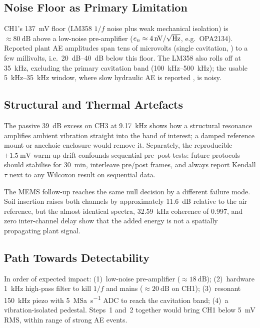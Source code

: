 \documentclass[10pt,a4paper,twocolumn]{article}
\begin{document}
\subsection{Noise Floor as Primary Limitation}

CH1's \SI{137}{\milli\volt} floor (LM358 $1/f$ noise plus weak mechanical isolation) is $\approx\SI{80}{\deci\bel}$ above a low-noise pre-amplifier ($e_n\approx\SI{4}{\nano\volt/\sqrt{\hertz}}$, e.g.\ OPA2134). Reported plant AE amplitudes span tens of microvolts (single cavitation, \citealp{Cochard1992}) to a few millivolts, i.e.\ \SIrange{20}{40}{\deci\bel} below this floor. The LM358 also rolls off at \SI{35}{\kilo\hertz}, excluding the primary cavitation band (\SIrange{100}{500}{\kilo\hertz}); the usable \SIrange{5}{35}{\kilo\hertz} window, where slow hydraulic AE is reported \citep{Gagliano2012,Khait2023}, is noisy.

\subsection{Structural and Thermal Artefacts}

The passive \SI{+39}{\deci\bel} excess on CH3 at \SI{9.17}{\kilo\hertz} shows how a structural resonance amplifies ambient vibration straight into the band of interest; a damped reference mount or anechoic enclosure would remove it. Separately, the reproducible $+\SI{1.5}{\milli\volt}$ warm-up drift confounds sequential pre--post tests: future protocols should stabilise for \SI{30}{\minute}, interleave pre/post frames, and always report Kendall $\tau$ next to any Wilcoxon result on sequential data.

The MEMS follow-up reaches the same null decision by a different failure mode. Soil insertion raises both channels by approximately \SI{11.6}{\deci\bel} relative to the air reference, but the almost identical spectra, \SI{32.59}{\kilo\hertz} coherence of 0.997, and zero inter-channel delay show that the added energy is not a spatially propagating plant signal.

\subsection{Path Towards Detectability}

In order of expected impact: (1)~low-noise pre-amplifier ($\approx\SI{18}{\deci\bel}$); (2)~hardware \SI{1}{\kilo\hertz} high-pass filter to kill $1/f$ and mains ($\approx\SI{20}{\deci\bel}$ on CH1); (3)~resonant \SI{150}{\kilo\hertz} piezo with \SI{5}{\mega Sa\per s} ADC to reach the cavitation band; (4)~a vibration-isolated pedestal. Steps~1 and~2 together would bring CH1 below \SI{5}{\milli\volt} RMS, within range of strong AE events.
\end{document}
